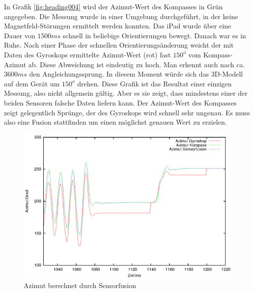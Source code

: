 In Grafik \ref{fig:heading004} wird der Azimut-Wert des Kompasses in Grün angegeben. Die Messung wurde in einer Umgebung durchgeführt, in der keine Magnetfeld-Störungen ermittelt werden konnten. Das iPad wurde über eine Dauer von $1500ms$ schnell in beliebige Orientierungen bewegt. Danach war es in Ruhe. Nach einer Phase der schnellen Orientierungsänderung weicht der mit Daten des Gyroskops ermittelte Azimut-Wert (rot) fast $150^o$ vom Kompass-Azimut ab. Diese Abweichung ist eindeutig zu hoch. Man erkennt auch nach ca. $3600ms$ den Angleichungssprung. In diesem Moment würde sich das 3D-Modell auf dem Gerät um $150^o$ drehen. Diese Grafik ist das Resultat einer einzigen Messung, also nicht allgemein gültig. Aber es sie zeigt, dass mindestens einer der beiden Sensoren falsche Daten liefern kann. Der Azimut-Wert des Kompasses zeigt gelegentlich Sprünge, der des Gyroskops wird schnell sehr ungenau. Es muss also eine Fusion stattfinden um einen möglichst genauen Wert zu erzielen.

\begin{figure}[htb]
\centering
\includegraphics[scale=1]{figures/heading003}
\caption{Azimut berechnet durch Sensorfusion}
\label{fig:heading003}
\end{figure}

